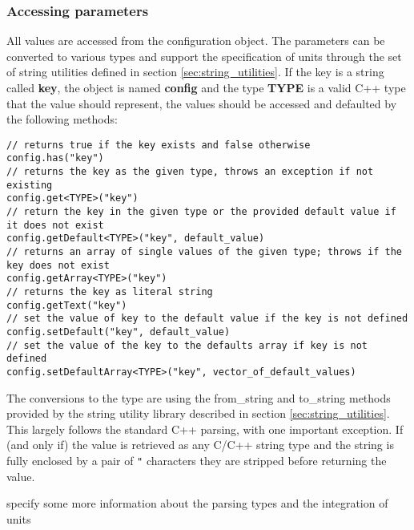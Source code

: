 \subsubsection{Accessing parameters}
\label{sec:accessing_parameters}
All values are accessed from the configuration object. The parameters can be converted to various types and support the specification of units through the set of \apsq string utilities defined in section \ref{sec:string_utilities}. If the key is a string called \textbf{key}, the object is named \textbf{config} and the type \textbf{TYPE} is a valid C++ type that the value should represent, the values should be accessed and defaulted by the following methods:
\begin{verbatim}
// returns true if the key exists and false otherwise
config.has("key") 
// returns the key as the given type, throws an exception if not existing
config.get<TYPE>("key") 
// return the key in the given type or the provided default value if it does not exist
config.getDefault<TYPE>("key", default_value) 
// returns an array of single values of the given type; throws if the key does not exist
config.getArray<TYPE>("key")
// returns the key as literal string
config.getText("key") 
// set the value of key to the default value if the key is not defined
config.setDefault("key", default_value) 
// set the value of the key to the defaults array if key is not defined
config.setDefaultArray<TYPE>("key", vector_of_default_values)
\end{verbatim}

The conversions to the type are using the from\_string and to\_string methods provided by the string utility library described in section \ref{sec:string_utilities}. This largely follows the standard C++ parsing, with one important exception. If (and only if) the value is retrieved as any C/C++ string type and the string is fully enclosed by a pair of \texttt{"} characters they are stripped before returning the value.

\todo specify some more information about the parsing types and the integration of units \todo

